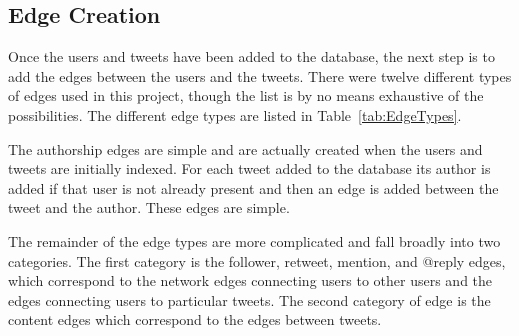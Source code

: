 \subsection{Edge Creation}
\label{sec:EdgeCreation}


Once the users and tweets have been added to the database, the next step is to add the edges between the users and the tweets. There were twelve different types of edges used in this project, though the list is by no means exhaustive of the possibilities. The different edge types are listed in Table~\ref{tab:EdgeTypes}.

The authorship edges are simple and are actually created when the users and tweets are initially indexed. For each tweet added to the database its author is added if that user is not already present and then an edge is added between the tweet and the author. These edges are simple.

The remainder of the edge types are more complicated and fall broadly into two categories. The first category is the follower, retweet, mention, and @reply edges, which correspond to the network edges connecting users to other users and the edges connecting users to particular tweets. The second category of edge is the content edges which correspond to the edges between tweets.


